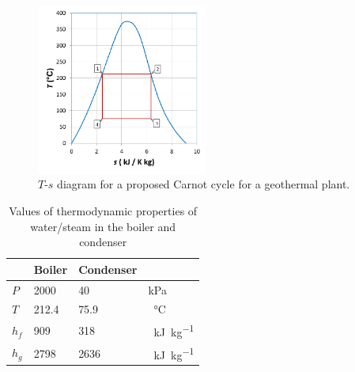 \documentclass[a4paper,12pt,fleqn]{article}
\begin{document}
\begin{figure}[h]
\centering
\includegraphics[width=0.5\textwidth]{./figures/Ts_q2.png}
\caption{$T$-$s$ diagram for a proposed Carnot cycle for a geothermal plant.}
\label{figure:q2}
\end{figure}

\begin{table}[h]
\caption{Values of thermodynamic properties of water/steam in the boiler and condenser}  %
\centering %
\begin{tabular}{l l l l} %
\hline\hline %
 & Boiler & Condenser &  \\ [0.5ex] %
\hline %
$P$ & 2000 & 40 & kPa \\ %
$T$ & 212.4 & 75.9 & \SI{}{\celsius} \\
$h_f$ & 909 & 318 & \SI{}{\kilo\joule\per\kg} \\
$h_g$ & 2798 & 2636 & \SI{}{\kilo\joule\per\kg}  \\ [1ex] %
\hline %
\end{tabular}
\label{table:q2} %
\end{table}
\end{document}
